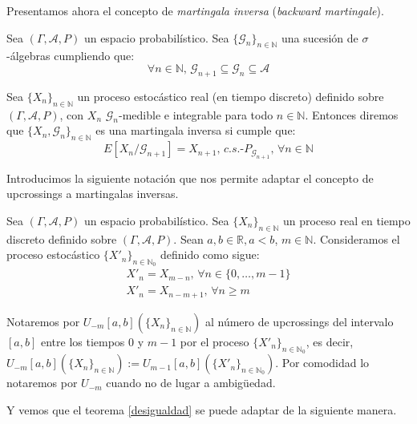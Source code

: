 Presentamos ahora el concepto de \emph{martingala inversa} (\emph{backward martingale}).

\begin{definicion}
Sea $(\Gamma , \mathcal{A}, P)$ un espacio probabilístico. Sea $\{\mathscr{G}_{n}\}_{n\in \mathds{N}}$ una sucesión de $\sigma$-álgebras cumpliendo que:
\begin{equation}\label{ecFiltInv}
\forall n\in \mathds{N} \text{, }\mathscr{G}_{n+1}\subseteq\mathscr{G}_{n}\subseteq\mathcal{A}
\end{equation}

Sea $\{X_n\}_{n\in \mathds{N}}$ un proceso estocástico real (en tiempo discreto) definido sobre $(\Gamma, \mathcal{A}, P)$, con $X_n$ $\mathscr{G}_{n}$-medible e integrable para todo $n\in\mathds{N}$. Entonces diremos que $\{X_n, \mathscr{G}_n\}_{n\in\mathds{N}}$ es una martingala inversa si cumple que:
$$ E[X_{n}/\mathscr{G}_{n+1}] = X_{n+1}\text{, }c.s.\text{-}P_{\mathscr{G}_{n+1}}\text{, }\forall n\in\mathds{N}$$
\end{definicion}

Introducimos la siguiente notación que nos permite adaptar el concepto de upcrossings a martingalas inversas.

\begin{notacion}\label{upcrossNot}
Sea $(\Gamma , \mathcal{A}, P)$ un espacio probabilístico. Sea $\{X_n\}_{n\in\mathds{N}}$ un proceso real en tiempo discreto definido sobre $(\Gamma , \mathcal{A}, P)$. Sean $a,b\in\mathds{R}, a<b$, $m\in\mathds{N}$. Consideramos el proceso estocástico  $\{X'_n\}_{n\in\mathds{N}_0}$ definido como sigue:
\begin{equation}
\begin{gathered}\label{ecUpcross}
X'_n = X_{m-n} \text{, }\forall n\in \{0,\ldots , m-1\} \\
X'_n = X_{n-m+1} \text{, }\forall n\geq m 
\end{gathered}
\end{equation}

Notaremos por $U_{-m}[a,b](\{X_n\}_{n\in\mathds{N}})$ al número de upcrossings del intervalo $[a,b]$ entre los tiempos $0$ y $m-1$ por el proceso $\{X'_n\}_{n\in\mathds{N}_0}$, es decir, $U_{-m}[a,b](\{X_n\}_{n\in\mathds{N}}):= U_{m-1}[a,b](\{X'_n\}_{n\in\mathds{N}_0})$. Por comodidad lo notaremos por $U_{-m}$ cuando no de lugar a ambigüedad.
\end{notacion}

Y vemos que el teorema \ref{desigualdad} se puede adaptar de la siguiente manera.

